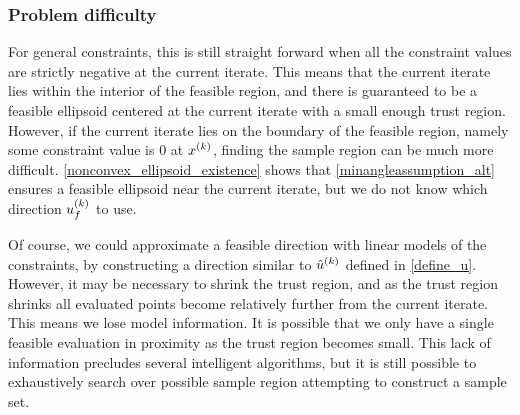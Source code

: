 \subsubsection{Problem difficulty}

For general constraints, this is still straight forward when all the constraint values are strictly negative at the current iterate.
This means that the current iterate lies within the interior of the feasible region,
and there is guaranteed to be a feasible ellipsoid centered at the current iterate with a small enough trust region.
However, if the current iterate lies on the boundary of the feasible region, namely some constraint value is $0$ at $x^{(k)}$, finding the sample region can be much more difficult.
\cref{nonconvex_ellipsoid_existence} shows that \cref{minangleassumption_alt} ensures a feasible ellipsoid near the current iterate,
but we do not know which direction ${u^{(k)}_f}$ to use.

Of course, we could approximate a feasible direction with linear models of the constraints, by constructing a direction similar to ${{\hat u}^{(k)}}$ defined in \cref{define_u}.
However, it may be necessary to shrink the trust region, and as the trust region shrinks all evaluated points become relatively further from the current iterate.
This means we lose model information.
It is possible that we only have a single feasible evaluation in proximity as the trust region becomes small.
This lack of information precludes several intelligent algorithms,
but it is still possible to exhaustively search over possible sample region attempting to construct a sample set.



